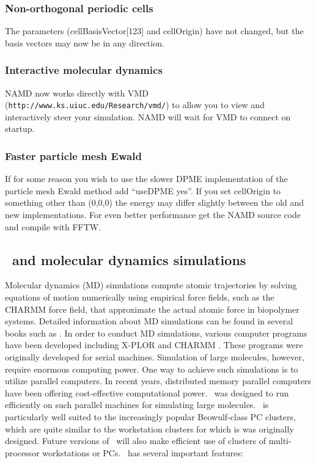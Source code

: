 \subsubsection*{Non-orthogonal periodic cells}

The parameters (cellBasisVector[123] and cellOrigin) have not changed,
but the basis vectors may now be in any direction.

\subsubsection*{Interactive molecular dynamics}

NAMD now works directly with VMD ({\tt http://www.ks.uiuc.edu/Research/vmd/})
to allow you to view and interactively steer your simulation.  NAMD will
wait for VMD to connect on startup.

\subsubsection*{Faster particle mesh Ewald}

If for some reason you wish to use the slower DPME implementation
of the particle mesh Ewald method add ``useDPME yes''.  If you set
cellOrigin to something other than (0,0,0) the energy may differ
slightly between the old and new implementations.  For even better
performance get the NAMD source code and compile with FFTW.

\subsection{\NAMD\ and molecular dynamics simulations}

Molecular dynamics (MD) simulations compute atomic trajectories by solving
equations of motion numerically using empirical force fields, such as the 
CHARMM force field, that approximate the actual atomic force in 
biopolymer systems. Detailed information about MD simulations can be found in
several books such as 
. 
In order to conduct MD simulations, various computer programs have been 
developed including
X-PLOR  and 
CHARMM .
These programs were originally developed for serial machines. 
Simulation of large molecules, however, require enormous computing power. 
One way to achieve such simulations is to utilize parallel computers. In recent 
years, distributed memory parallel computers have been offering
cost-effective computational power.  \NAMD\ was designed to run efficiently
on such parallel 
machines for simulating large molecules. 
\NAMD\ is particularly well suited to the increasingly popular Beowulf-class PC clusters, which are quite similar to the workstation clusters for which is was originally designed.
Future versions of \NAMD\ will also make efficient use of clusters of multi-processor workstations or PCs.
\prettypar
\NAMD\ has several important features: 

